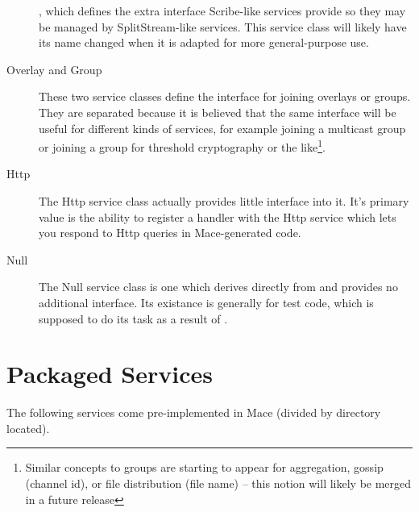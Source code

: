\begin{description}
  , which defines the extra interface
  Scribe-like services provide so they may be managed by SplitStream-like
  services.  This service class will likely have its name changed when it is
  adapted for more general-purpose use.
\item[Overlay and Group] These two service classes define the interface for joining overlays or 
  groups.  They are separated because it is believed that the same interface
  will be useful for different kinds of services, for example joining a
  multicast group or joining a group for threshold cryptography or the
  like\footnote{Similar concepts to groups are starting to appear for
  aggregation, gossip (channel id), or file distribution (file name) -- this
  notion will likely be merged in a future release}.
\item[Http] The Http service class actually provides little interface into it.  It's primary value 
  is the ability to register a handler with the Http service which lets you respond to Http
  queries in Mace-generated code.
\item[Null] The Null service class is one which derives directly from  and
  provides no additional interface.  Its existance is generally for test code, 
  which is supposed to do its task as a result of .
\end{description}

\section{Packaged Services}
\label{sec:packaged-services}

The following services come pre-implemented in Mace (divided by directory located).

